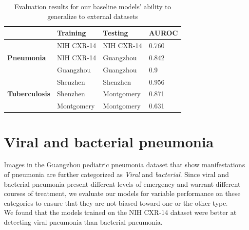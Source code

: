 \documentclass[12pt,oneside,a4paper]{report}
\begin{document}
\begin{table}[]
  \centering
  \begin{tabular}{@{}llll@{}}
    \toprule
    \textbf{}                              & \textbf{Training} & \textbf{Testing} & \textbf{AUROC} \\ \midrule
    \multirow{3}{*}{\textbf{Pneumonia}}    & NIH CXR-14        & NIH CXR-14       & 0.760                                                                            \\ \cmidrule(l){2-4} 
                                           & NIH CXR-14        & Guangzhou   & 0.842                                                                           \\ \cmidrule(l){2-4} 
                                           & Guangzhou    & Guangzhou   & 0.9                                                                            \\ \midrule
    \multirow{3}{*}{\textbf{Tuberculosis}} & Shenzhen          & Shenzhen         & 0.956                                                                            \\ \cmidrule(l){2-4} 
                                           & Shenzhen          & Montgomery       & 0.871                                                                           \\ \cmidrule(l){2-4} 
                                           & Montgomery        & Montgomery       & 0.631                                                                            \\ \bottomrule
  \end{tabular}
  \caption{Evaluation results for our baseline models' ability to generalize to
    external datasets}
  \label{tab:generalization}
\end{table}

\section{Viral and bacterial pneumonia}
Images in the Guangzhou pediatric pneumonia dataset that show manifestations
of pneumonia are further categorized as \emph{Viral} and \emph{bacterial}.
Since viral and bacterial pneumonia present different levels of emergency and warrant
different courses of treatment, we evaluate our models for variable performance on these
categories to ensure that they are not biased toward one or the other type.\\

We found that the models trained on the NIH CXR-14 dataset were better at
detecting viral pneumonia than bacterial pneumonia.
\end{document}
